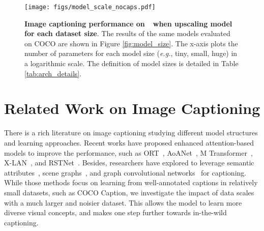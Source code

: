



\begin{figure*}[t]
\centering
\texttt{[image: figs/model\_scale\_nocaps.pdf]}
\caption{\textbf{Image captioning performance on~\nocaps~when upscaling model for each dataset size}. The results of the same models evaluated on COCO are shown in Figure \ref{fig:model_size}. The x-axis plots the number of parameters for each model size (\emph{e.g.}, tiny, small, huge) in a logarithmic scale. The definition of model sizes is detailed in Table \ref{tab:arch_details}. }
\label{fig:model_size_nocaps}
\end{figure*}

\section{Related Work on Image Captioning}
There is a rich literature on image captioning studying different model structures and learning approaches. Recent works have proposed enhanced attention-based models to improve the performance, such as ORT~\cite{herdade2019image}, AoANet~\cite{huang2019attention}, M Transformer~\cite{cornia2020meshed}, X-LAN~\cite{pan2020x}, and RSTNet~\cite{zhang2021rstnet}. Besides, researchers have explored to leverage semantic attributes~\cite{yao2017boosting,li2019entangled}, scene graphs~\cite{yang2019auto}, and graph convolutional networks~\cite{yao2018exploring} for captioning.
While those methods focus on learning from well-annotated captions in relatively small datasets, such as COCO Caption, we investigate the impact of data scales with a much larger and noisier dataset. This allows the model to learn more diverse visual concepts, and makes one step further towards in-the-wild captioning.

